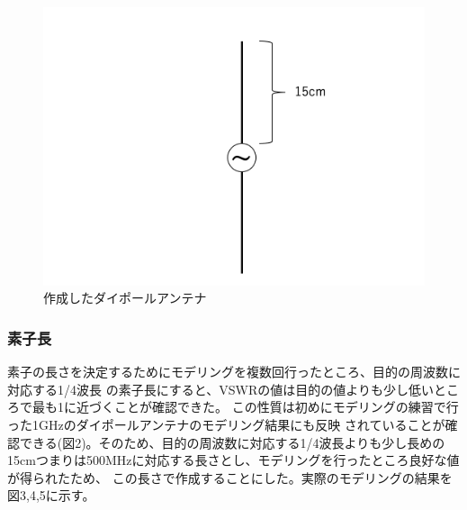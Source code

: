 \documentclass[dvipdfmx,autodetect-engine,titlepage]{jsarticle}
\begin{document}
\begin{figure}[h]
  \centering
  \includegraphics[scale=0.4]{pic3.png}
  \caption{作成したダイポールアンテナ}
\end{figure}

\subsubsection*{素子長}
素子の長さを決定するためにモデリングを複数回行ったところ、目的の周波数に対応する1/4波長
の素子長にすると、VSWRの値は目的の値よりも少し低いところで最も1に近づくことが確認できた。
この性質は初めにモデリングの練習で行った1GHzのダイポールアンテナのモデリング結果にも反映
されていることが確認できる(図2)。そのため、目的の周波数に対応する1/4波長よりも少し長めの
15cmつまりは500MHzに対応する長さとし、モデリングを行ったところ良好な値が得られたため、
この長さで作成することにした。実際のモデリングの結果を図3,4,5に示す。
\end{document}

